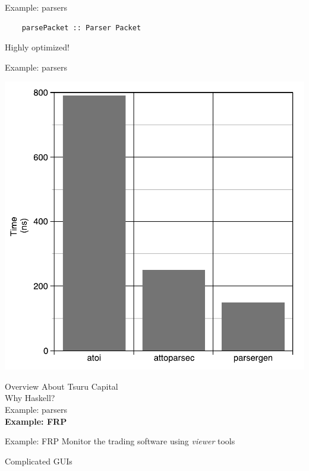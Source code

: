\documentclass[20pt]{beamer}
\newcommand{\vspaced}{
    \vspace{5mm}
}
\begin{document}
\begin{frame}[fragile]{Example: parsers}
    \begin{lstlisting}
    parsePacket :: Parser Packet
    \end{lstlisting}
    \vspaced
    Highly optimized!
\end{frame}

\begin{frame}{Example: parsers}
    \begin{center}
    \includegraphics[height=0.8\textheight]{images/atoi.pdf}
    \end{center}
\end{frame}


\begin{frame}{Overview}
    About Tsuru Capital \\
    Why Haskell? \\
    Example: parsers \\
    \textbf{Example: FRP} \\
\end{frame}

\begin{frame}{Example: FRP}
    Monitor the trading software using \emph{viewer} tools \\
    \vspaced
    Complicated GUIs
\end{frame}
\end{document}
